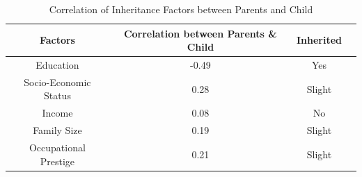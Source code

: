 \documentclass[12pt,twoside]{reedthesis}
\begin{document}
\begin{table}[htbp] %
	\caption[Correlation of Inheritance Factors between Parents and Child]{Correlation of Inheritance Factors between Parents and Child}
	\begin{center}
		\begin{tabular}{c c c c}
			\toprule %
			Factors               & Correlation between Parents \& Child & Inherited \\ %
			\midrule %
			Education             & -0.49                                & Yes       \\ %
			Socio-Economic Status & 0.28                                 & Slight    \\
			Income                & 0.08                                 & No        \\
			Family Size           & 0.19                                 & Slight    \\
			Occupational Prestige & 0.21                                 & Slight    \\
			\bottomrule %
		\end{tabular}
	\end{center}
	\label{inheritance} %
\end{table}
\end{document}
